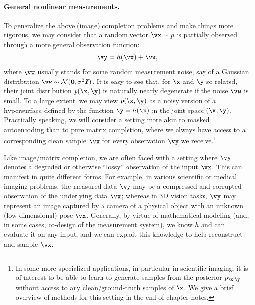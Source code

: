 \documentclass[../../book-main.tex]{subfiles}
\begin{document}
\paragraph{General nonlinear measurements.}
To generalize the above (image) completion problems and make things more rigorous, we may consider that a random vector $\vx \sim p$ is partially observed through a more
general observation function:
\begin{equation}\label{eq:measurement-matching-observation}
\vy = h(\vx) + \vw,
\end{equation}
where $\vw$ usually stands for some random measurement noise, say of
a Gaussian distribution $\vw \sim \mathcal{N}(\mathbf{0}, \sigma^2
\boldsymbol{I})$. It is easy to see that, for $\x$ and $\y$ so related, their joint distribution $p(\x, \y)$ is naturally nearly degenerate if the noise $\vw$ is small. To a large extent, we may view $p(\x, \y)$ as a noisy version of a hypersurface defined by the function $\y = h(\x)$ in the joint space $(\x, \y)$.  Practically speaking, we will consider a setting more akin to masked autoencoding than to pure matrix completion, where we always have access to a corresponding clean sample $\vx$ for every observation $\vy$ we receive.\footnote{In some more specialized applications, in particular in scientific imaging, it is of interest to be able to learn to generate samples from the posterior $p_{\x \mid \y}$ without access to any clean/ground-truth samples of $\x$. We give a brief overview of methods for this setting in the end-of-chapter notes.}

Like image/matrix completion, we
are often faced with a setting where $\vy$ denotes a degraded or otherwise
``lossy''
observation of the input $\vx$. This can manifest in quite different
forms. For example, in various scientific or
medical imaging problems, the measured data $\vy$ may be a compressed and
corrupted observation of the underlying data $\vx$; whereas in 3D vision tasks,
$\vy$ may represent an image captured by a camera of a physical object with an
unknown (low-dimensional) pose $\vx$.
Generally, by virtue of mathematical modeling (and, in some cases, co-design
of the measurement system), we know $h$ and can evaluate it on any input, and
we can exploit this knowledge to help reconstruct and sample $\vx$.
\end{document}
